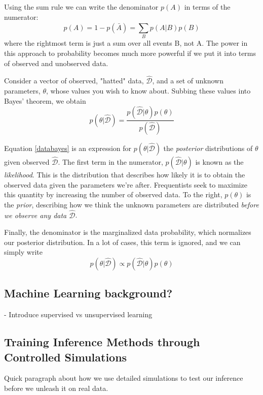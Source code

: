 \documentclass[12pt]{article}
\begin{document}
Using the sum rule we can write the denominator $p(A)$ in terms of the numerator:
\begin{equation}
    p(A) = 1 - p(\bar{A}) = \sum_{B}^{} p(A | B)p(B)
\end{equation}
where the rightmost term is just a sum over all events B, not A. \cite{bishop_2006} The power in this approach to probability becomes much more powerful if we put it into terms of observed and unobserved data.

Consider a vector of observed, "hatted" data, $\hat{\mathscr{D}}$, and a set of unknown parameters, $\theta$, whose values you wish to know about. Subbing these values into Bayes' theorem, we obtain
\begin{equation}\label{databayes}
    p(\theta|\hat{\mathscr{D}}) = \frac{p(\hat{\mathscr{D}} | \theta)p(\theta)}{p(\hat{\mathscr{D}})}
\end{equation}

Equation \ref{databayes} is an expression for $p(\theta |\hat{\mathscr{D}} )$ the \textit{posterior} distributions of $\theta$ given observed $\hat{\mathscr{D}}$. The first term in the numerator, $p(\hat{\mathscr{D}} | \theta)$ is known as the \textit{likelihood}. This is the distribution that describes how likely it is to obtain the observed data given the parameters we're after. Frequentists seek to maximize this quantity by increasing the number of observed data. \cite{bayesianmethods} To the right, $p(\theta)$ is the \textit{prior}, describing how we think the unknown parameters are distributed \textit{before we observe any data $\hat{\mathscr{D}}$}.

Finally, the denominator is the marginalized data probability, which normalizes our posterior distribution. In a lot of cases, this term is ignored, and we can simply write
\begin{equation}
       p(\theta|\hat{\mathscr{D}}) \propto p(\hat{\mathscr{D}} | \theta)p(\theta)
\end{equation}


\subsection{Machine Learning background?}
- Introduce supervised vs unsupervised learning

\subsection{Training Inference Methods through Controlled Simulations}
Quick paragraph about how we use detailed simulations to test our inference before we unleash it on real data.
\end{document}
